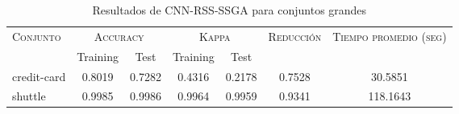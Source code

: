 \begin{table}[]
\centering
\begin{tabular}{l c c c c c c}
\hline
\multirow{2}{*}{\textsc{Conjunto}}
	& \multicolumn{2}{c}{\textsc{Accuracy}}
	& \multicolumn{2}{c}{\textsc{Kappa}}
	& \textsc{Reducción}
	& \textsc{Tiempo promedio (seg)} \\
	& Training & Test
	& Training & Test \\ 
\hline
\hline

credit-card & 0.8019 & 0.7282 & 0.4316 & 0.2178 & 0.7528 & 30.5851 \\
shuttle & 0.9985 & 0.9986 & 0.9964 & 0.9959 & 0.9341 & 118.1643 \\

\hline
\end{tabular}
\caption{Resultados de CNN-RSS-SSGA para conjuntos grandes }
\label{res-grande-CNN-RSS-ssga}
\end{table}

